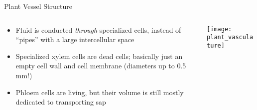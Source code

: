 \documentclass[10pt]{beamer}
\begin{document}
\begin{frame}{Plant Vessel Structure}
  \begin{columns}
    \begin{column}{.49\textwidth}
      \begin{itemize}
      \item Fluid is conducted \emph{through} specialized cells,
        instead of ``pipes'' with a large intercellular space
      \item Specialized xylem cells are dead cells; basically just an
        empty cell wall and cell membrane (diameters up to 0.5 mm!)
      \item Phloem cells are living, but their volume is still mostly
        dedicated to transporting sap
      \end{itemize}
    \end{column}
    \begin{column}{.49\textwidth}
      \vfill
      \texttt{[image: plant\_vasculature]}
      \vfill
    \end{column}
  \end{columns}
\end{frame}
\end{document}
